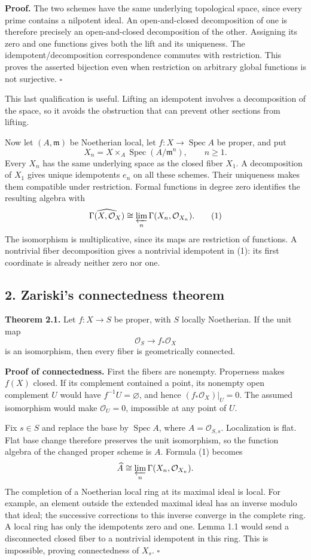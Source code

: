 \documentclass[11pt]{article}
\begin{document}
\textbf{Proof.} The two schemes have the same underlying topological
space, since every prime contains a nilpotent ideal. An open-and-closed
decomposition of one is therefore precisely an open-and-closed
decomposition of the other. Assigning its zero and one functions gives
both the lift and its uniqueness. The idempotent/decomposition
correspondence commutes with restriction. This proves the asserted
bijection even when restriction on arbitrary global functions is not
surjective. \(\square\)

This last qualification is useful. Lifting an idempotent involves a
decomposition of the space, so it avoids the obstruction that can
prevent other sections from lifting.

Now let \((A,\mathfrak m)\) be Noetherian local, let
\(f:X\to\operatorname{Spec}A\) be proper, and put \[
X_n=X\times_A\operatorname{Spec}(A/\mathfrak m^n),\qquad n\geq1.
\] Every \(X_n\) has the same underlying space as the closed fiber
\(X_1\). A decomposition of \(X_1\) gives unique idempotents \(e_n\) on
all these schemes. Their uniqueness makes them compatible under
restriction. Formal functions in degree zero identifies the resulting
algebra with \[
\widehat{\Gamma(X,\mathcal O_X)}
\cong\varprojlim_n\Gamma(X_n,\mathcal O_{X_n}).
\tag{1}
\] The isomorphism is multiplicative, since its maps are restriction of
functions. A nontrivial fiber decomposition gives a nontrivial
idempotent in (1): its first coordinate is already neither zero nor one.

\subsection{2. Zariski's connectedness
theorem}\label{zariskis-connectedness-theorem}

\textbf{Theorem 2.1.} Let \(f:X\to S\) be proper, with \(S\) locally
Noetherian. If the unit map \[
\mathcal O_S\longrightarrow f_*\mathcal O_X
\] is an isomorphism, then every fiber is geometrically connected.

\textbf{Proof of connectedness.} First the fibers are nonempty.
Properness makes \(f(X)\) closed. If its complement contained a point,
its nonempty open complement \(U\) would have \(f^{-1}U=\varnothing\),
and hence \((f_*\mathcal O_X)|_U=0\). The assumed isomorphism would make
\(\mathcal O_U=0\), impossible at any point of \(U\).

Fix \(s\in S\) and replace the base by \(\operatorname{Spec}A\), where
\(A=\mathcal O_{S,s}\). Localization is flat. Flat base change therefore
preserves the unit isomorphism, so the function algebra of the changed
proper scheme is \(A\). Formula (1) becomes \[
\widehat A\cong\varprojlim_n\Gamma(X_n,\mathcal O_{X_n}).
\] The completion of a Noetherian local ring at its maximal ideal is
local. For example, an element outside the extended maximal ideal has an
inverse modulo that ideal; the successive corrections to this inverse
converge in the complete ring. A local ring has only the idempotents
zero and one. Lemma 1.1 would send a disconnected closed fiber to a
nontrivial idempotent in this ring. This is impossible, proving
connectedness of \(X_s\). \(\square\)
\end{document}
